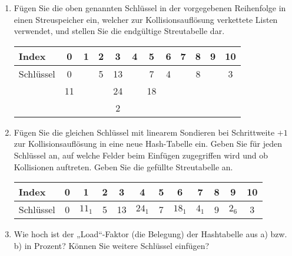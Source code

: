 \documentclass{bschlangaul-aufgabe}
\begin{document}
\begin{enumerate}


\item Fügen Sie die oben genannten Schlüssel in der vorgegebenen
Reihenfolge in einen Streuspeicher ein, welcher zur Kollisionsauflösung
verkettete Listen verwendet, und stellen Sie die endgültige
Streutabelle dar.

\begin{liAntwort}
\begin{center}
\begin{tabular}{l|ccccccccccc}
Index     & 0  & 1 & 2 & 3  & 4 & 5  & 6 & 7 & 8 & 9 & 10\\\hline
Schlüssel & 0  &   & 5 & 13 &   & 7  & 4 &   & 8 &   & 3 \\
          & 11 &   &   & 24 &   & 18 &   &   &   &   &  \\
          &    &   &   & 2  &   &    &   &   &   &   &  \\
\end{tabular}
\end{center}
\end{liAntwort}


\item Fügen Sie die gleichen Schlüssel mit linearem Sondieren bei
Schrittweite $+1$ zur Kollisionsauflösung in eine neue Hash-Tabelle ein.
Geben Sie für jeden Schlüssel an, auf welche Felder beim Einfügen
zugegriffen wird und ob Kollisionen auftreten. Geben Sie die gefüllte
Streutabelle an.

\begin{liAntwort}
\begin{center}
\begin{tabular}{l|ccccccccccc}
Index     & 0  & 1      & 2 & 3  & 4       & 5  & 6      & 7      & 8 & 9      & 10\\\hline
Schlüssel & 0  & $11_1$ & 5 & 13 & $24_1$  & 7  & $18_1$ & $4_1$  & 9 & $2_6$  & 3 \\
\end{tabular}
\end{center}
\end{liAntwort}


\item Wie hoch ist der „Load“-Faktor (die Belegung) der Hashtabelle aus
a) bzw. b) in Prozent? Können Sie weitere Schlüssel einfügen?

\begin{liAntwort}


\end{liAntwort}
\end{enumerate}
\end{document}
